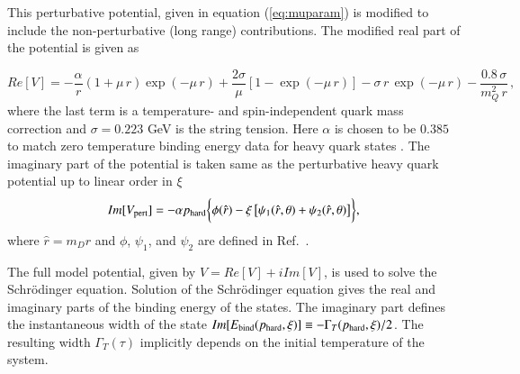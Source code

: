 This perturbative potential, given in equation (\ref{eq:muparam}) is modified to include
the non-perturbative (long range) contributions. 
The modified real part of the potential is given as~\cite{Dumitru:2007hy} 


%
\begin{equation} 
\label{eq:repot}
Re[V] = -\frac{\alpha}{r} \left(1+\mu \, r\right) \exp\left( -\mu
\, r  \right) + \frac{2\sigma}{\mu}\left[1-\exp\left( -\mu
\, r  \right)\right] 
 - \sigma \,r\, \exp(-\mu\,r)- \frac{0.8 \, \sigma}{m_Q^2\, r} \, ,
\end{equation}
%
where the last term is a temperature- and spin-independent quark mass correction 
\cite{Bali:1997am} and $\sigma = 0.223$ GeV is the string tension.  Here  $\alpha$ 
is chosen to be  $0.385$ 
to match zero temperature
binding energy data for heavy quark states \cite{Dumitru:2007hy}.
The imaginary part of the potential is taken same as the perturbative heavy quark
potential up to linear order in $\xi$ 
%
\begin{equation} 
Im[V_{\rm pert}] = -\alpha p_{\rm hard} \biggl\{ \phi(\hat{r}) - \xi \left[\psi_1(\hat{r},
\theta)+\psi_2(\hat{r}, \theta)\right]\biggr\} ,
\label{eq:impot}
\end{equation}
%
where $\hat{r}=m_D r$ and $\phi$, $\psi_1$, and $\psi_2$ are defined in Ref.~\cite{Krouppa:2016jcl}. 

 The full model potential, given by $V = Re[V] + i Im[V]$, is used to 
solve the Schr\"odinger equation. 
Solution of the Schr\"odinger equation gives the real and imaginary parts of 
the binding energy of the states.  The imaginary part defines the instantaneous width of the state
$Im[E_{\rm bind}(p_{\rm hard},\xi)] \equiv -\Gamma_T(p_{\rm hard},\xi)/2$. 
The resulting width $\Gamma_T(\tau)$ implicitly depends on the initial temperature of the
system.


